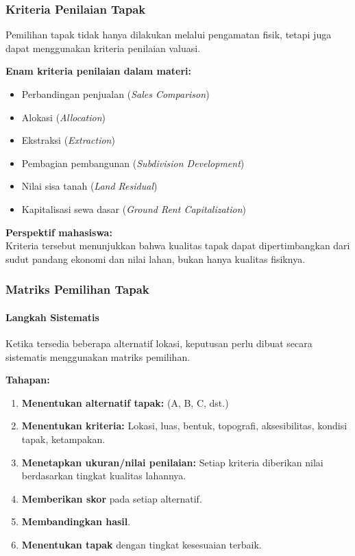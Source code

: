 \documentclass[../main.tex]{subfiles}
\begin{document}
\begin{frame}[mytitle=standard, t, mycolor=digiPH_gray, light]
	\frametitle{Kriteria Penilaian Tapak}

	Pemilihan tapak tidak hanya dilakukan melalui pengamatan fisik, tetapi juga dapat menggunakan kriteria penilaian valuasi.

	\vspace{0.3cm}
	\textbf{Enam kriteria penilaian dalam materi:}
	\begin{itemize}
		\item Perbandingan penjualan (\textit{Sales Comparison})
		\item Alokasi (\textit{Allocation})
		\item Ekstraksi (\textit{Extraction})
		\item Pembagian pembangunan (\textit{Subdivision Development})
		\item Nilai sisa tanah (\textit{Land Residual})
		\item Kapitalisasi sewa dasar (\textit{Ground Rent Capitalization})
	\end{itemize}

	\vspace{0.3cm}
	\textbf{Perspektif mahasiswa:}\\
	Kriteria tersebut menunjukkan bahwa kualitas tapak dapat dipertimbangkan dari sudut pandang ekonomi dan nilai lahan, bukan hanya kualitas fisiknya.
\end{frame}

\begin{frame}[mytitle=standard, t, mycolor=digiPH_white, light]
	\frametitle{Matriks Pemilihan Tapak}
	\framesubtitle{Langkah Sistematis}

	Ketika tersedia beberapa alternatif lokasi, keputusan perlu dibuat secara sistematis menggunakan matriks pemilihan.

	\vspace{0.3cm}
	\textbf{Tahapan:}
	\begin{enumerate}
		\item \textbf{Menentukan alternatif tapak:} (A, B, C, dst.)
		\item \textbf{Menentukan kriteria:} Lokasi, luas, bentuk, topografi, aksesibilitas, kondisi tapak, ketampakan.
		\item \textbf{Menetapkan ukuran/nilai penilaian:} Setiap kriteria diberikan nilai berdasarkan tingkat kualitas lahannya.
		\item \textbf{Memberikan skor} pada setiap alternatif.
		\item \textbf{Membandingkan hasil}.
		\item \textbf{Menentukan tapak} dengan tingkat kesesuaian terbaik.
	\end{enumerate}
\end{frame}
\end{document}

